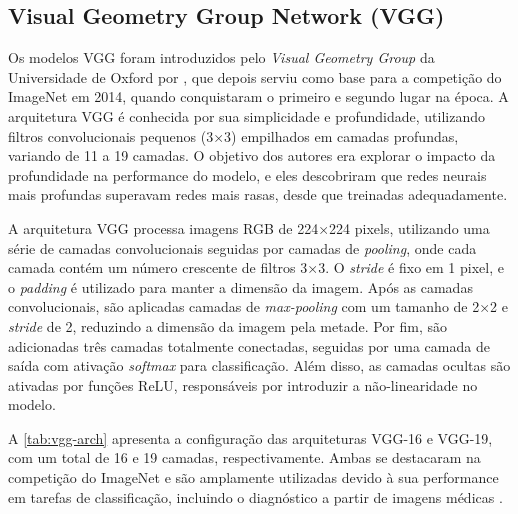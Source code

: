 \subsection{Visual Geometry Group Network (VGG)}

Os modelos VGG foram introduzidos pelo \textit{Visual Geometry Group} da Universidade de Oxford por , que depois serviu como base para a competição do ImageNet em 2014, quando conquistaram o primeiro e segundo lugar na época. A arquitetura VGG é conhecida por sua simplicidade e profundidade, utilizando filtros convolucionais pequenos (3×3) empilhados em camadas profundas, variando de 11 a 19 camadas. O objetivo dos autores era explorar o impacto da profundidade na performance do modelo, e eles descobriram que redes neurais mais profundas superavam redes mais rasas, desde que treinadas adequadamente.

A arquitetura VGG processa imagens RGB de 224×224 pixels, utilizando uma série de camadas convolucionais seguidas por camadas de \textit{pooling}, onde cada camada contém um número crescente de filtros 3×3. O \textit{stride} é fixo em 1 pixel, e o \textit{padding} é utilizado para manter a dimensão da imagem. Após as camadas convolucionais, são aplicadas camadas de \textit{max-pooling} com um tamanho de 2×2 e \textit{stride} de 2, reduzindo a dimensão da imagem pela metade. Por fim, são adicionadas três camadas totalmente conectadas, seguidas por uma camada de saída com ativação \textit{softmax} para classificação. Além disso, as camadas ocultas são ativadas por funções ReLU, responsáveis por introduzir a não-linearidade no modelo.

A \autoref{tab:vgg-arch} apresenta a configuração das arquiteturas VGG-16 e VGG-19, com um total de 16 e 19 camadas, respectivamente. Ambas se destacaram na competição do ImageNet e são amplamente utilizadas devido à sua performance em tarefas de classificação, incluindo o diagnóstico a partir de imagens médicas \cite{Saini2023, Sitaula2021}.

